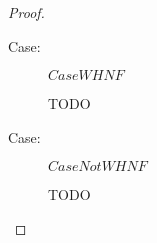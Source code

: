 \begin{proof}
\begin{description}
\item[Case:] $CaseWHNF$
\begin{tabbing}
    TODO
\end{tabbing}

\item[Case:] $CaseNotWHNF$
\begin{tabbing}
    TODO
\end{tabbing}

\end{description}

\end{proof}


